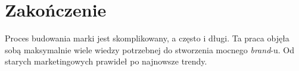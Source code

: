 \documentclass [a4paper, 11pt]{article}
\begin{document}
\section{Zakończenie}
Proces budowania marki jest skomplikowany, a często i długi. Ta praca objęła sobą maksymalnie wiele wiedzy potrzebnej do stworzenia mocnego \emph{brand}-u. Od starych marketingowych prawideł po najnowsze trendy.
\clearpage


\end{document}
